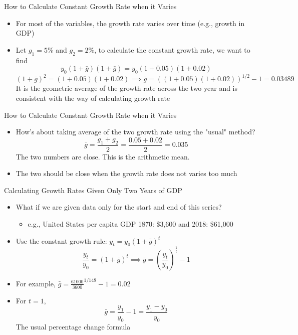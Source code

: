 \documentclass[aspectratio=1610]{beamer}
\begin{document}
\begin{frame}[wide]{How to Calculate Constant Growth Rate when it Varies}
	\begin{itemize}
		\item For most of the variables, the growth rate varies over time (e.g., growth in GDP)
		\item Let $g_1=5\%$ and $g_2=2\%$, to calculate the constant growth rate, we want to find
		\[y_0 (1+\bar{g}) (1+\bar{g}) = y_0 (1+0.05)(1+0.02)\]
		\[(1+\bar{g})^2 = (1+0.05)(1+0.02) \implies \bar{g} = \left((1+0.05)(1+0.02)\right)^{1/2} -1 = 0.03489\]
		It is the geometric average of the growth rate across the two year and is consistent with the way of calculating growth rate
	\end{itemize}
\end{frame}

\begin{frame}[wide]{How to Calculate Constant Growth Rate when it Varies}
	\begin{itemize}
		\item How's about taking average of the two growth rate using the "usual" method?
		\[\bar{g} = \frac{g_1+g_2}{2} = \frac{0.05+0.02}{2} = 0.035\]
		The two numbers are close. This is the arithmetic mean.
		\item The two should be close when the growth rate does not varies too much
	\end{itemize}
\end{frame}

\begin{frame}[wide]{Calculating Growth Rates Given Only Two Years of GDP}
	\begin{itemize}
		\item What if we are given data only for the start and end of this series?
		\begin{itemize}
			\item e.g., United States per capita GDP 1870: \$3,600 and 2018: \$61,000
			
		\end{itemize}
		\item Use the constant growth rule: $y_t=y_0 (1+\bar{g})^t$
			\[\frac{y_t}{y_0} = (1+\bar{g})^t \implies \bar{g} = \left(\frac{y_t}{y_0}\right)^{\frac{1}{t}}-1\]
		\item For example, $\bar{g} = \frac{61000}{3600}^{1/148} - 1 = 0.02$
		\item For $t=1$, 
		\[\bar{g} = \frac{y_1}{y_0}- 1 = \frac{y_1-y_0}{y_0}\]
		The usual percentage change formula
	\end{itemize}
\end{frame}
\end{document}
